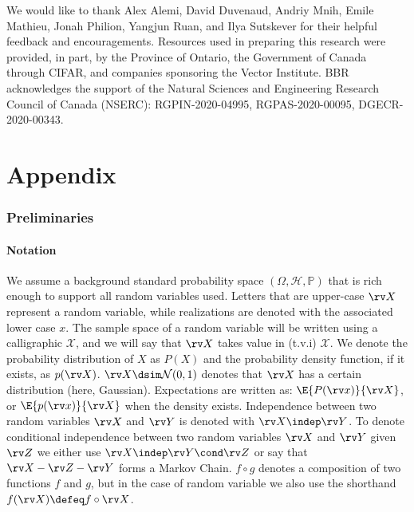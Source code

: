 \documentclass[final]{article}
\begin{document}
\begin{ack}
We would like to thank Alex Alemi, David Duvenaud, Andriy Mnih, Emile Mathieu, Jonah Philion, Yangjun Ruan, and Ilya Sutskever for their helpful feedback and encouragements.
Resources used in preparing this research were provided, in part, by the Province of Ontario, the Government of Canada through CIFAR, and companies sponsoring the Vector Institute.
BBR acknowledges the support of the Natural Sciences and Engineering Research Council of Canada (NSERC): RGPIN-2020-04995, RGPAS-2020-00095, DGECR-2020-00343.
\end{ack}
 



\clearpage
\newpage



\appendix
{} \part{Appendix} 



\parttoc 



\clearpage
\newpage


\section{Preliminaries}
\label{appx:preliminaries}


\subsection{Notation}
\label{appx:notation}



We assume a background standard probability space $(\Omega, \mathcal{H}, \mathbb{P})$ that is rich enough to support all random variables used. 
Letters that are upper-case $\rv X$ represent a random variable, while realizations are denoted with the associated lower case $x$. 
The sample space of a random variable will be written using a calligraphic $\mathcal{X}$, and we will say that $\rv X$ takes value in (t.v.i) $\mathcal{X}$.
We denote the probability distribution of $X$ as $P(X)$ and the probability density function, if it exists, as $p(\rv X)$.
$\rv X \dsim \mathcal{N}(0,1)$ denotes that $\rv X$ has a certain distribution (here, Gaussian).
Expectations are written as: $\E{P(\rv x)}{\rv X}$, or $\E{p(\rv x)}{\rv X}$ when the density exists.
Independence between two random variables $\rv X$ and $\rv Y$ is denoted with $\rv X \indep \rv Y$.
To denote conditional independence between two random variables $\rv X$ and $\rv Y$ given $\rv Z$ we either use $\rv X  \indep \rv Y \cond \rv Z$ or say that $\rv X - \rv Z - \rv Y$ forms a Markov Chain. 
$f \circ g$ denotes a composition of two functions $f$ and $g$, but in the case of random variable we also use the shorthand $f(\rv X) \defeq f \circ \rv X$.
\end{document}
